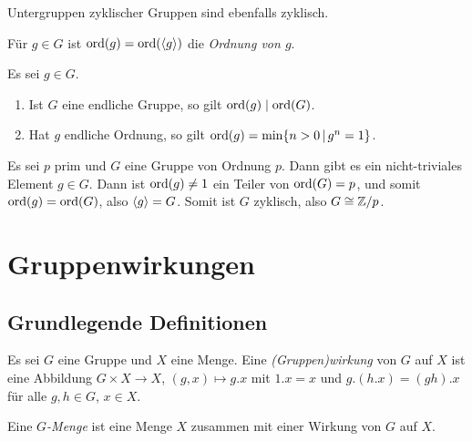 \begin{corollary}
  Untergruppen zyklischer Gruppen sind ebenfalls zyklisch.
\end{corollary}

\begin{definition}
  Für $g \in G$ ist $\operatorname{ord}(g) = \operatorname{ord}(\langle g\rangle)$ die \emph{Ordnung von $g$}.
\end{definition}

\begin{lemma}
  Es sei $g \in G$.
  \begin{enumerate}
    \item
      Ist $G$ eine endliche Gruppe, so gilt $\operatorname{ord}(g) \mathrel{|} \operatorname{ord}(G)$.
    \item
      Hat $g$ endliche Ordnung, so gilt $\ord{g} = \min \{ n > 0 \suchthat g^n = 1 \}$.
  \end{enumerate}
\end{lemma}

\begin{example}
  Es sei $p$ prim und $G$ eine Gruppe von Ordnung $p$.
  Dann gibt es ein nicht-triviales Element $g \in G$.
  Dann ist $\operatorname{ord}(g) \neq 1$ ein Teiler von $\operatorname{ord}(G) = p$, und somit $\operatorname{ord}(g) = \operatorname{ord}(G)$, also $\langle g\rangle = G$.
  Somit ist $G$ zyklisch, also $G \cong \mathbb{Z}/p$.
\end{example}






\section{Gruppenwirkungen}



\subsection{Grundlegende Definitionen}

\begin{definition}
  Es sei $G$ eine Gruppe und $X$ eine Menge.
  Eine \emph{\textup(Gruppen\textup)wirkung} von $G$ auf $X$ ist eine Abbildung $G \times X \to X$, $(g,x) \mapsto g.x$ mit $1.x = x$ und $g.(h.x) = (gh).x$ für alle $g, h \in G$, $x \in X$.
  
  Eine \emph{$G$-Menge} ist eine Menge $X$ zusammen mit einer Wirkung von $G$ auf $X$.
\end{definition}

